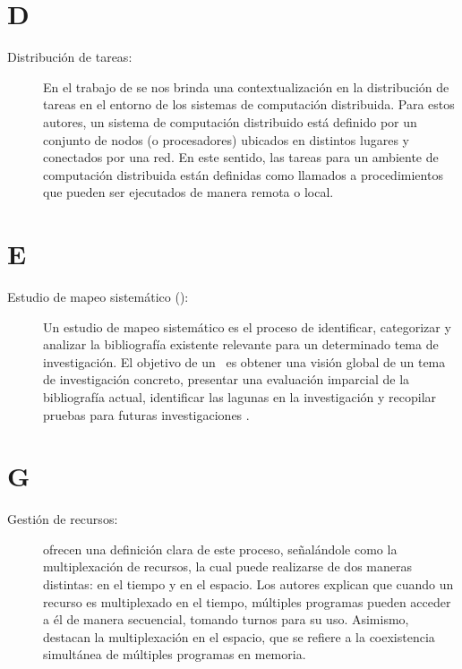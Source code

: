 \section*{D}
\begin{description}
	\item[Distribución de tareas:] En el trabajo de \cite{Chang1995} se nos brinda una contextualización en la distribución de tareas en el entorno de los sistemas de computación distribuida. Para estos autores, un sistema de computación distribuido está definido por un conjunto de nodos (o procesadores) ubicados en distintos lugares y conectados por una red. En este sentido, las tareas para un ambiente de computación distribuida están definidas como llamados a procedimientos que pueden ser ejecutados de manera remota o local.
\end{description}

\section*{E}
\begin{description}
	\item[Estudio de mapeo sistemático (\SMS):] Un estudio de mapeo sistemático es el proceso de identificar, categorizar y analizar la bibliografía existente relevante para un determinado tema de investigación. El objetivo de un \SMS~es obtener una visión global de un tema de investigación concreto, presentar una evaluación imparcial de la bibliografía actual, identificar las lagunas en la investigación y recopilar pruebas para futuras investigaciones \citep{Salama2017}.
\end{description}

\section*{G}
\begin{description}
	\item[Gestión de recursos:] \cite{Tanenbaum2015} ofrecen una definición clara de este proceso, señalándole como la multiplexación de recursos, la cual puede realizarse de dos maneras distintas: en el tiempo y en el espacio. Los autores explican que cuando un recurso es multiplexado en el tiempo, múltiples programas pueden acceder a él de manera secuencial, tomando turnos para su uso. Asimismo, destacan la multiplexación en el espacio, que se refiere a la coexistencia simultánea de múltiples programas en memoria.
\end{description}

